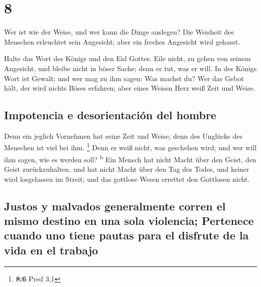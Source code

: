 \hypertarget{section-7}{%
\section{8}\label{section-7}}

 Wer ist wie der Weise, und wer kann die Dinge auslegen?
Die Weisheit des Menschen erleuchtet sein Angesicht; aber ein freches
Angesicht wird gehasst.

 Halte das Wort des Königs und den Eid Gottes.
 Eile nicht, zu gehen von seinem Angesicht, und bleibe
nicht in böser Sache; denn er tut, was er will.  In des
Königs Wort ist Gewalt; und wer mag zu ihm sagen: Was machst du?
 Wer das Gebot hält, der wird nichts Böses erfahren; aber
eines Weisen Herz weiß Zeit und Weise.

\hypertarget{impotencia-e-desorientaciuxf3n-del-hombre}{%
\subsection{Impotencia e desorientación del
hombre}\label{impotencia-e-desorientaciuxf3n-del-hombre}}

 Denn ein jeglich Vornehmen hat seine Zeit und Weise; denn
des Unglücks des Menschen ist viel bei ihm. \footnote{\textbf{8:6} Pred
  3,1}  Denn er weiß nicht, was geschehen wird; und wer
will ihm sagen, wie es werden soll? \textsuperscript{b} 
Ein Mensch hat nicht Macht über den Geist, den Geist zurückzuhalten, und
hat nicht Macht über den Tag des Todes, und keiner wird losgelassen im
Streit; und das gottlose Wesen errettet den Gottlosen nicht.

\hypertarget{justos-y-malvados-generalmente-corren-el-mismo-destino-en-una-sola-violencia-pertenece-cuando-uno-tiene-pautas-para-el-disfrute-de-la-vida-en-el-trabajo}{%
\subsection{Justos y malvados generalmente corren el mismo destino en
una sola violencia; Pertenece cuando uno tiene pautas para el disfrute
de la vida en el
trabajo}\label{justos-y-malvados-generalmente-corren-el-mismo-destino-en-una-sola-violencia-pertenece-cuando-uno-tiene-pautas-para-el-disfrute-de-la-vida-en-el-trabajo}}

